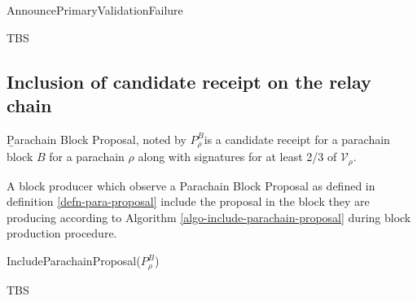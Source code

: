 \begin{algorithm}[H]
  \caption[]{\sc AnnouncePrimaryValidationFailure}
  \label{algo-announce-primary-validation-failure}
  \begin{algorithmic}[1]
    \Require{}

    \State TBS
  \end{algorithmic}
\end{algorithm}

\subsection{Inclusion of candidate receipt on the relay chain}\label{sect-inclusion-of-candidate-receipt}

\begin{definition}
  \label{defn-para-proposal}
        {\b Parachain Block Proposal}, noted by $P^B_{\rho}$is a candidate receipt for a parachain block $B$ for a parachain $\rho$ along with signatures for at least 2/3 of $\mathcal{V}_\rho$.  %

\end{definition}

A block producer which observe a Parachain Block Proposal as defined in definition \ref{defn-para-proposal}  include the proposal in the block they are producing according to Algorithm \ref{algo-include-parachain-proposal} during block production procedure.

\begin{algorithm}[H]
  \caption[]{\sc IncludeParachainProposal($P^B_{\rho}$)}
  \label{algo-include-parachain-proposal}
  \begin{algorithmic}[1]
    \Require{}

    \State TBS
  \end{algorithmic}
\end{algorithm}
